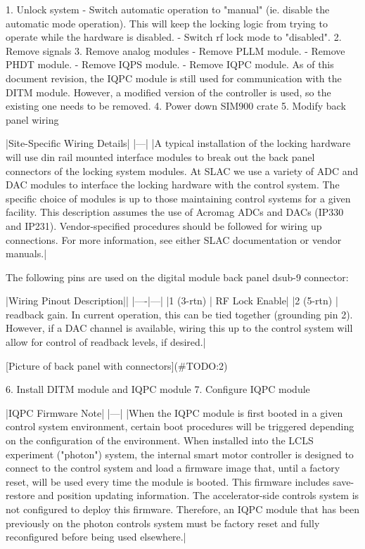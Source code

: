 \documentclass{article}
\begin{document}
1. Unlock system
- Switch automatic operation to "manual" (ie. disable the automatic mode operation). This will keep the locking logic from trying to operate while the hardware is disabled.
- Switch rf lock mode to "disabled".
2. Remove signals
3. Remove analog modules
- Remove PLLM module.
- Remove PHDT module.
- Remove IQPS module.
- Remove IQPC module. As of this document revision, the IQPC module is still used for communication with the DITM module. However, a modified version of the controller is used, so the existing one needs to be removed.
4. Power down SIM900 crate
5. Modify back panel wiring

|Site-Specific Wiring Details|
|---|
|A typical installation of the locking hardware will use din rail mounted interface modules to break out the back panel connectors of the locking system modules. At SLAC we use a variety of ADC and DAC modules to interface the locking hardware with the control system. The specific choice of modules is up to those maintaining control systems for a given facility. This description assumes the use of Acromag ADCs and DACs (IP330 and IP231). Vendor-specified procedures should be followed for wiring up connections. For more information, see either SLAC documentation or vendor manuals.|

The following pins are used on the digital module back panel dsub-9 connector:

|Wiring Pinout Description||
|----|---|
|1 (3-rtn) | RF Lock Enable|
|2 (5-rtn) | readback gain. In current operation, this can be tied together (grounding pin 2). However, if a DAC channel is available, wiring this up to the control system will allow for control of readback levels, if desired.|

[Picture of back panel with connectors](#TODO:2)

6. Install DITM module and IQPC module
7. Configure IQPC module

|IQPC Firmware Note|
|---|
|When the IQPC module is first booted in a given control system environment, certain boot procedures will be triggered depending on the configuration of the environment. When installed into the LCLS experiment ("photon") system, the internal smart motor controller is designed to connect to the control system and load a firmware image that, until a factory reset, will be used every time the module is booted. This firmware includes save-restore and position updating information. The accelerator-side controls system is not configured to deploy this firmware. Therefore, an IQPC module that has been previously on the photon controls system must be factory reset and fully reconfigured before being used elsewhere.|
\end{document}
